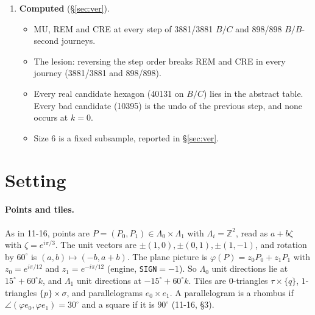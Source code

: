 \documentclass[11pt]{article}
\theoremstyle{definition}\newtheorem{definition}[theorem]{Definition}\newtheorem{remark}[theorem]{Remark}
\newcommand{\Z}{\mathbb Z}
\begin{document}
\begin{enumerate}
\begin{itemize}
\item The configurations that do not survive it (``bad'', 8 of 32) are \emph{undo moves}. (N), which Lemma~\ref{lem:start} needs, follows from Purbhoo's definition of a mosaic (Lemma~\ref{lem:N}). After any good step, the only bad configuration compatible with the tiles just produced is that step's own hexagon (Lemma~\ref{lem:undo}). At a journey's start there is none (Lemma~\ref{lem:start}).
\item Taking an undo would make the deterministic journey $2$-periodic. A terminating journey therefore never takes a bad step (Proposition~\ref{prop:good}).
\end{itemize}
\item \textbf{Computed} (\S\ref{sec:ver}).
\begin{itemize}
\item MU, REM and CRE at every step of 3881/3881 $B/C$ and 898/898 $B/B$-second journeys.
\item The lesion: reversing the step order breaks REM and CRE in every journey (3881/3881 and 898/898).
\item Every real candidate hexagon (40131 on $B/C$) lies in the abstract table. Every bad candidate (10395) is the undo of the previous step, and none occurs at $k=0$.
\item Size 6 is a fixed subsample, reported in \S\ref{sec:ver}.
\end{itemize}
\end{enumerate}

\section{Setting}\label{sec:set}
\paragraph{Points and tiles.} As in 11-16, points are $P=(P_0,P_1)\in\Lambda_0\times\Lambda_1$ with $\Lambda_i=\Z^2$, read as $a+b\zeta$ with $\zeta=e^{i\pi/3}$. The unit vectors are $\pm(1,0),\pm(0,1),\pm(1,-1)$, and rotation by $60^\circ$ is $(a,b)\mapsto(-b,a+b)$.
The plane picture is $\varphi(P)=z_0P_0+z_1P_1$ with $z_0=e^{i\pi/12}$ and $z_1=e^{-i\pi/12}$ (engine, \texttt{SIGN}$=-1$). So $\Lambda_0$ unit directions lie at $15^\circ+60^\circ k$, and $\Lambda_1$ unit directions at $-15^\circ+60^\circ k$.
Tiles are $0$-triangles $\tau\times\{q\}$, $1$-triangles $\{p\}\times\sigma$, and parallelograms $e_0\times e_1$. A parallelogram is a rhombus if $\angle(\varphi e_0,\varphi e_1)=30^\circ$ and a square if it is $90^\circ$ (11-16, \S3).
\end{document}

